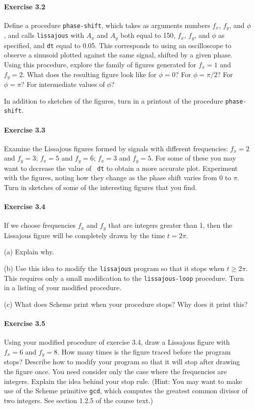 \paragraph{Exercise 3.2}
Define a procedure {\tt phase-shift}, which takes as arguments numbers
$f_x$, $f_y$, and $\phi$, and calls {\tt lissajous} with $A_x$ and
$A_y$ both equal to 150, $f_x$, $f_y$, and $\phi$ as specified, and
{\tt dt} equal to 0.05.  This corresponds to using an oscilloscope to
observe a sinusoid plotted against the same signal, shifted by a given
phase.  Using this procedure, explore the family of figures generated
for $f_x=1$ and $f_y=2$. What does the resulting figure look like for
$\phi=0$? For $\phi=\pi/2$? For $\phi=\pi$? For intermediate values of
$\phi$?

In addition to sketches of the figures, turn in a printout of the
procedure {\tt phase-shift}.

\paragraph{Exercise 3.3}
Examine the Lissajous figures formed by signals with different
frequencies: $f_x=2$ and $f_y=3$; $f_x=5$ and $f_y=6$; $f_x=3$ and
$f_y=5$. For some of these you may want to decrease the value of {\tt
dt} to obtain a more accurate plot.  Experiment with the figures,
noting how they change as the phase shift varies from 0 to $\pi$.
Turn in sketches of some of the interesting figures that you find.

\paragraph{Exercise 3.4}
If we choose frequencies $f_x$ and $f_y$ that are integers greater
than 1, then the Lissajous figure will be completely drawn by the time
$t=2\pi$.

(a) Explain why.

(b) Use this idea to modify the {\tt lissajous} program so that it stops when
$t \geq 2 \pi$.  This requires only a small modification to the
{\tt lissajous-loop} procedure.  Turn in a listing of your modified procedure.

(c) What does Scheme print when your procedure stops?  Why does it print this?

\paragraph{Exercise 3.5}
Using your modified procedure of exercise 3.4, draw a Lissajous figure
with $f_x=6$ and $f_y=8$.  How many times is the figure traced before
the program stops?  Describe how to modify your program so that it
will stop after drawing the figure once.  You need consider only the
case where the frequencies are integers.  Explain the idea behind your
stop rule.  (Hint: You may want to make use of the Scheme primitive
{\tt gcd}, which computes the greatest common divisor of two integers.
See section 1.2.5 of the course text.)


